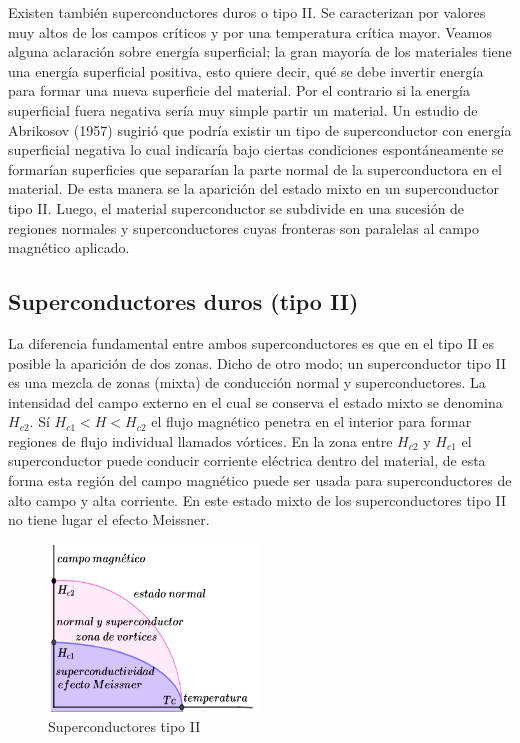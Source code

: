 Existen también superconductores duros o tipo II. Se caracterizan por valores muy altos de los campos críticos y por una temperatura crítica mayor. Veamos alguna aclaración sobre energía superficial; la gran mayoría de los materiales tiene una energía superficial positiva, esto quiere decir, qué se debe invertir energía para formar una nueva superficie del material. Por el contrario si la energía superficial fuera negativa sería muy simple partir un material. Un estudio de Abrikosov (1957) sugirió que podría existir un tipo de superconductor con energía superficial negativa lo cual indicaría bajo ciertas condiciones espontáneamente se formarían superficies que separarían la parte normal de la superconductora en el material. De esta manera se la aparición del estado mixto en un superconductor tipo II. Luego, el material superconductor se subdivide en una sucesión de regiones normales y superconductores cuyas fronteras son paralelas al campo magnético aplicado.

\subsection{Superconductores duros (tipo II)}

La diferencia fundamental entre ambos superconductores es que en el tipo II es posible la aparición de dos zonas. Dicho de otro modo; un superconductor tipo II es una mezcla de zonas (mixta) de conducción normal y superconductores. La intensidad del campo externo en el cual se conserva el estado mixto se denomina $H_{c2}$. Sí $H_{c1} < H < H_{c2}$ el flujo magnético penetra en el interior para formar regiones de flujo individual llamados vórtices. En la zona entre $H_{c2}$ y $H_{c1}$ el superconductor puede conducir corriente eléctrica dentro del material, de esta forma esta región del campo magnético puede ser usada para superconductores de alto campo y alta corriente. En este estado mixto de los superconductores tipo II no tiene lugar el efecto Meissner.

\begin{figure}[H]
    \centering
    \includegraphics[width=0.5\textwidth]{./Figures/fig420}
	\caption{Superconductores tipo II}
	\label{fig:420}
\end{figure}

